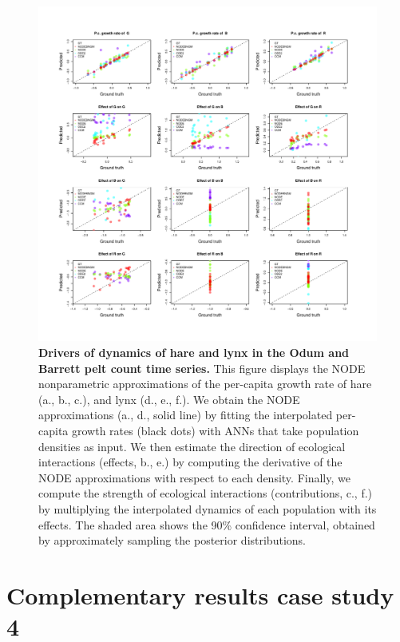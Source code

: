 \documentclass[11pt, oneside]{article}
\begin{document}
\newpage
\begin{figure}[H]
\includegraphics[width=1\linewidth,page=17]{figures/figures_supplementary.pdf}
\caption{
    \textbf{Drivers of dynamics of hare and lynx in the Odum and Barrett pelt count time series.}
    This figure displays the NODE nonparametric approximations of the per-capita growth rate of hare (a., b., c.), and lynx (d., e., f.).
    We obtain the NODE approximations (a., d., solid line) by fitting the interpolated per-capita growth rates (black dots) with ANNs that take population densities as input.
    We then estimate the direction of ecological interactions (effects, b., e.) by computing the derivative of the NODE approximations with respect to each density.
    Finally, we compute the strength of ecological interactions (contributions, c., f.) by multiplying the interpolated dynamics of each population with its effects.
    The shaded area shows the 90\% confidence interval, obtained by approximately sampling the posterior distributions. 
}
\end{figure}
\newpage

\newpage
\section{Complementary results case study 4}
\end{document}
